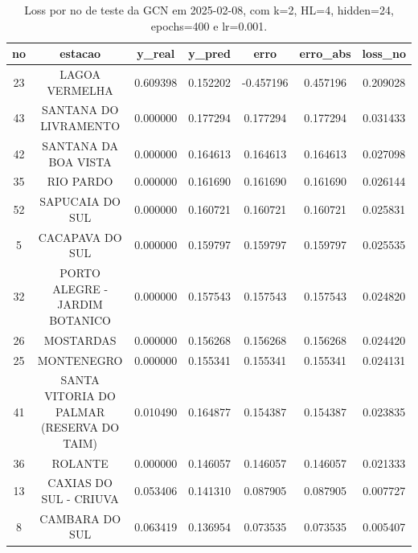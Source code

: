 \begin{table}[h]
\centering
\caption{Loss por no de teste da GCN em 2025-02-08, com k=2, HL=4, hidden=24, epochs=400 e lr=0.001.}
\label{tab:gcn_loss_k2_hl4_h24_e400_d20250208}
\begin{tabular}{ccccccc}
\toprule
no & estacao & y\_real & y\_pred & erro & erro\_abs & loss\_no \\
\midrule
23 & LAGOA VERMELHA & 0.609398 & 0.152202 & -0.457196 & 0.457196 & 0.209028 \\
43 & SANTANA DO LIVRAMENTO & 0.000000 & 0.177294 & 0.177294 & 0.177294 & 0.031433 \\
42 & SANTANA DA BOA VISTA & 0.000000 & 0.164613 & 0.164613 & 0.164613 & 0.027098 \\
35 & RIO PARDO & 0.000000 & 0.161690 & 0.161690 & 0.161690 & 0.026144 \\
52 & SAPUCAIA DO SUL & 0.000000 & 0.160721 & 0.160721 & 0.160721 & 0.025831 \\
5 & CACAPAVA DO SUL & 0.000000 & 0.159797 & 0.159797 & 0.159797 & 0.025535 \\
32 & PORTO ALEGRE - JARDIM BOTANICO & 0.000000 & 0.157543 & 0.157543 & 0.157543 & 0.024820 \\
26 & MOSTARDAS & 0.000000 & 0.156268 & 0.156268 & 0.156268 & 0.024420 \\
25 & MONTENEGRO & 0.000000 & 0.155341 & 0.155341 & 0.155341 & 0.024131 \\
41 & SANTA VITORIA DO PALMAR (RESERVA DO TAIM) & 0.010490 & 0.164877 & 0.154387 & 0.154387 & 0.023835 \\
36 & ROLANTE & 0.000000 & 0.146057 & 0.146057 & 0.146057 & 0.021333 \\
13 & CAXIAS DO SUL - CRIUVA & 0.053406 & 0.141310 & 0.087905 & 0.087905 & 0.007727 \\
8 & CAMBARA DO SUL & 0.063419 & 0.136954 & 0.073535 & 0.073535 & 0.005407 \\
\bottomrule
\end{tabular}
\end{table}
